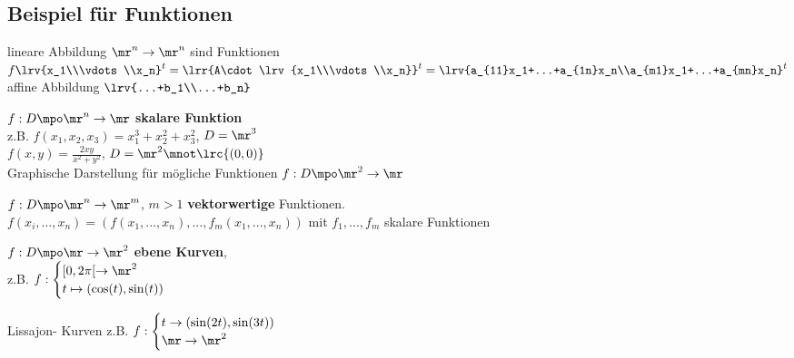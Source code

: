 \subsection{Beispiel für Funktionen}
		\item  lineare Abbildung $ \mr^n\rightarrow\mr^n $ sind Funktionen $ f\lrv{x_1\\\vdots\\x_n}^t=\lrr{A\cdot\lrv{x_1\\\vdots\\x_n}}^t=\lrv{a_{11}x_1+...+a_{1n}x_n\\a_{m1}x_1+...+a_{mn}x_n}^t$\\
		affine Abbildung $ \lrv{...+b_1\\...+b_n} $
		\item  $ f:D\mpo\mr^n\rightarrow\mr $ \textbf{skalare Funktion}\\
		z.B. $ f(x_1,x_2,x_3)=x_1^3+x_2^2+x_3^2 $, $ D=\mr^3 $\\
		$ f(x,y)=\frac{2xy}{x^2+y^2} $, $ D=\mr^2\mnot\lrc{(0,0)} $\\
		Graphische Darstellung für mögliche Funktionen $ f:D\mpo\mr^2\rightarrow\mr $
		
		
		\item  $ f:D\mpo\mr^n\rightarrow\mr^m $, $ m>1 $ \textbf{vektorwertige} Funktionen.\\
		$ f(x_i,...,x_n)=(f(x_1,...,x_n),...,f_m(x_1,...,x_n)) $ mit $ f_1,...,f_m $ skalare Funktionen
		
		\item $ f:D\mpo\mr\rightarrow\mr^2 $ \textbf{ebene Kurven},\\
		z.B. $ f:\begin{cases}[0,2\pi[\rightarrow\mr^2\\t\mapsto(\cos(t),\sin(t))\end{cases} $
		
		
		Lissajon- Kurven z.B. $ f:\begin{cases}t\rightarrow(\sin(2t),\sin(3t))\\\mr\rightarrow\mr^2\end{cases} $
		
